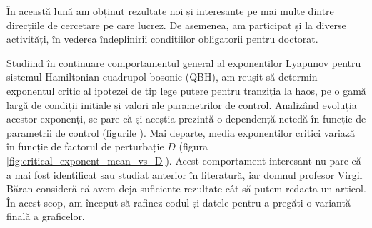 
\makereportpreamble

În această lună am obținut rezultate noi și interesante pe mai multe dintre direcțiile de cercetare pe care lucrez. De asemenea, am participat și la diverse activități, în vederea îndeplinirii condițiilor obligatorii pentru doctorat.

Studiind în continuare comportamentul general al exponenților Lyapunov pentru sistemul Hamiltonian cuadrupol bosonic (QBH), am reușit să determin exponentul critic al ipotezei de tip lege putere pentru tranziția la haos, pe o gamă largă de condiții inițiale și valori ale parametrilor de control. Analizând evoluția acestor exponenți, se pare că și aceștia prezintă o dependență netedă în funcție de parametrii de control (figurile ). Mai departe, media exponenților critici variază în funcție de factorul de perturbație \(D\) (figura \ref{fig:critical_exponent_mean_vs_D}). Acest comportament interesant nu pare că a mai fost identificat sau studiat anterior în literatură, iar domnul profesor Virgil Băran consideră că avem deja suficiente rezultate cât să putem redacta un articol. În acest scop, am început să rafinez codul și datele pentru a pregăti o variantă finală a graficelor.
        
